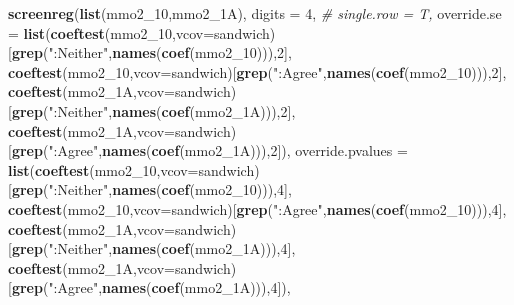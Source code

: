 \documentclass[
]{article}
\newenvironment{Shaded}{\begin{snugshade}}{\end{snugshade}}
\newcommand{\CommentTok}[1]{\textcolor[rgb]{0.56,0.35,0.01}{\textit{#1}}}
\newcommand{\DataTypeTok}[1]{\textcolor[rgb]{0.13,0.29,0.53}{#1}}
\newcommand{\DecValTok}[1]{\textcolor[rgb]{0.00,0.00,0.81}{#1}}
\newcommand{\KeywordTok}[1]{\textcolor[rgb]{0.13,0.29,0.53}{\textbf{#1}}}
\newcommand{\NormalTok}[1]{#1}
\newcommand{\StringTok}[1]{\textcolor[rgb]{0.31,0.60,0.02}{#1}}
\begin{document}
\begin{Shaded}
\begin{Highlighting}[]
\KeywordTok{screenreg}\NormalTok{(}\KeywordTok{list}\NormalTok{(mmo2_}\DecValTok{10}\NormalTok{,mmo2_1A), }\DataTypeTok{digits =} \DecValTok{4}\NormalTok{, }\CommentTok{# single.row = T,}
          \DataTypeTok{override.se =} \KeywordTok{list}\NormalTok{(}\KeywordTok{coeftest}\NormalTok{(mmo2_}\DecValTok{10}\NormalTok{,}\DataTypeTok{vcov=}\NormalTok{sandwich)[}\KeywordTok{grep}\NormalTok{(}\StringTok{":Neither"}\NormalTok{,}\KeywordTok{names}\NormalTok{(}\KeywordTok{coef}\NormalTok{(mmo2_}\DecValTok{10}\NormalTok{))),}\DecValTok{2}\NormalTok{],}
                             \KeywordTok{coeftest}\NormalTok{(mmo2_}\DecValTok{10}\NormalTok{,}\DataTypeTok{vcov=}\NormalTok{sandwich)[}\KeywordTok{grep}\NormalTok{(}\StringTok{":Agree"}\NormalTok{,}\KeywordTok{names}\NormalTok{(}\KeywordTok{coef}\NormalTok{(mmo2_}\DecValTok{10}\NormalTok{))),}\DecValTok{2}\NormalTok{],}
                             \KeywordTok{coeftest}\NormalTok{(mmo2_1A,}\DataTypeTok{vcov=}\NormalTok{sandwich)[}\KeywordTok{grep}\NormalTok{(}\StringTok{":Neither"}\NormalTok{,}\KeywordTok{names}\NormalTok{(}\KeywordTok{coef}\NormalTok{(mmo2_1A))),}\DecValTok{2}\NormalTok{],}
                             \KeywordTok{coeftest}\NormalTok{(mmo2_1A,}\DataTypeTok{vcov=}\NormalTok{sandwich)[}\KeywordTok{grep}\NormalTok{(}\StringTok{":Agree"}\NormalTok{,}\KeywordTok{names}\NormalTok{(}\KeywordTok{coef}\NormalTok{(mmo2_1A))),}\DecValTok{2}\NormalTok{]),}
          \DataTypeTok{override.pvalues =} \KeywordTok{list}\NormalTok{(}\KeywordTok{coeftest}\NormalTok{(mmo2_}\DecValTok{10}\NormalTok{,}\DataTypeTok{vcov=}\NormalTok{sandwich)[}\KeywordTok{grep}\NormalTok{(}\StringTok{":Neither"}\NormalTok{,}\KeywordTok{names}\NormalTok{(}\KeywordTok{coef}\NormalTok{(mmo2_}\DecValTok{10}\NormalTok{))),}\DecValTok{4}\NormalTok{],}
                                  \KeywordTok{coeftest}\NormalTok{(mmo2_}\DecValTok{10}\NormalTok{,}\DataTypeTok{vcov=}\NormalTok{sandwich)[}\KeywordTok{grep}\NormalTok{(}\StringTok{":Agree"}\NormalTok{,}\KeywordTok{names}\NormalTok{(}\KeywordTok{coef}\NormalTok{(mmo2_}\DecValTok{10}\NormalTok{))),}\DecValTok{4}\NormalTok{],}
                                  \KeywordTok{coeftest}\NormalTok{(mmo2_1A,}\DataTypeTok{vcov=}\NormalTok{sandwich)[}\KeywordTok{grep}\NormalTok{(}\StringTok{":Neither"}\NormalTok{,}\KeywordTok{names}\NormalTok{(}\KeywordTok{coef}\NormalTok{(mmo2_1A))),}\DecValTok{4}\NormalTok{],}
                                  \KeywordTok{coeftest}\NormalTok{(mmo2_1A,}\DataTypeTok{vcov=}\NormalTok{sandwich)[}\KeywordTok{grep}\NormalTok{(}\StringTok{":Agree"}\NormalTok{,}\KeywordTok{names}\NormalTok{(}\KeywordTok{coef}\NormalTok{(mmo2_1A))),}\DecValTok{4}\NormalTok{]),}

\end{Highlighting}
\end{Shaded}
\end{document}

